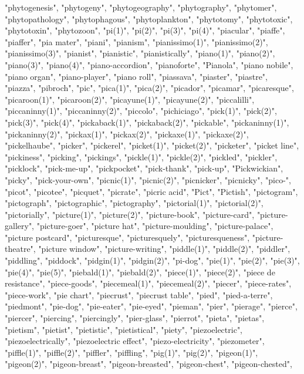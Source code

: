 "phytogenesis",
"phytogeny",
"phytogeography",
"phytography",
"phytomer",
"phytopathology",
"phytophagous",
"phytoplankton",
"phytotomy",
"phytotoxic",
"phytotoxin",
"phytozoon",
"pi(1)",
"pi(2)",
"pi(3)",
"pi(4)",
"piacular",
"piaffe",
"piaffer",
"pia mater",
"piani",
"pianism",
"pianissimo(1)",
"pianissimo(2)",
"pianissimo(3)",
"pianist",
"pianistic",
"pianistically",
"piano(1)",
"piano(2)",
"piano(3)",
"piano(4)",
"piano-accordion",
"pianoforte",
"Pianola",
"piano nobile",
"piano organ",
"piano-player",
"piano roll",
"piassava",
"piaster",
"piastre",
"piazza",
"pibroch",
"pic",
"pica(1)",
"pica(2)",
"picador",
"picamar",
"picaresque",
"picaroon(1)",
"picaroon(2)",
"picayune(1)",
"picayune(2)",
"piccalilli",
"piccaninny(1)",
"piccaninny(2)",
"piccolo",
"pichiciago",
"pick(1)",
"pick(2)",
"pick(3)",
"pick(4)",
"pickaback(1)",
"pickaback(2)",
"pickable",
"pickaninny(1)",
"pickaninny(2)",
"pickax(1)",
"pickax(2)",
"pickaxe(1)",
"pickaxe(2)",
"pickelhaube",
"picker",
"pickerel",
"picket(1)",
"picket(2)",
"picketer",
"picket line",
"pickiness",
"picking",
"pickings",
"pickle(1)",
"pickle(2)",
"pickled",
"pickler",
"picklock",
"pick-me-up",
"pickpocket",
"pick-thank",
"pick-up",
"Pickwickian",
"picky",
"pick-your-own",
"picnic(1)",
"picnic(2)",
"picnicker",
"picnicky",
"pico-",
"picot",
"picotee",
"picquet",
"picrate",
"picric acid",
"Pict",
"Pictish",
"pictogram",
"pictograph",
"pictographic",
"pictography",
"pictorial(1)",
"pictorial(2)",
"pictorially",
"picture(1)",
"picture(2)",
"picture-book",
"picture-card",
"picture-gallery",
"picture-goer",
"picture hat",
"picture-moulding",
"picture-palace",
"picture postcard",
"picturesque",
"picturesquely",
"picturesqueness",
"picture-theatre",
"picture window",
"picture-writing",
"piddle(1)",
"piddle(2)",
"piddler",
"piddling",
"piddock",
"pidgin(1)",
"pidgin(2)",
"pi-dog",
"pie(1)",
"pie(2)",
"pie(3)",
"pie(4)",
"pie(5)",
"piebald(1)",
"piebald(2)",
"piece(1)",
"piece(2)",
"piece de resistance",
"piece-goods",
"piecemeal(1)",
"piecemeal(2)",
"piecer",
"piece-rates",
"piece-work",
"pie chart",
"piecrust",
"piecrust table",
"pied",
"pied-a-terre",
"piedmont",
"pie-dog",
"pie-eater",
"pie-eyed",
"pieman",
"pier",
"pierage",
"pierce",
"piercer",
"piercing",
"piercingly",
"pier-glass",
"pierrot",
"pieta",
"pietas",
"pietism",
"pietist",
"pietistic",
"pietistical",
"piety",
"piezoelectric",
"piezoelectrically",
"piezoelectric effect",
"piezo-electricity",
"piezometer",
"piffle(1)",
"piffle(2)",
"piffler",
"piffling",
"pig(1)",
"pig(2)",
"pigeon(1)",
"pigeon(2)",
"pigeon-breast",
"pigeon-breasted",
"pigeon-chest",
"pigeon-chested",
